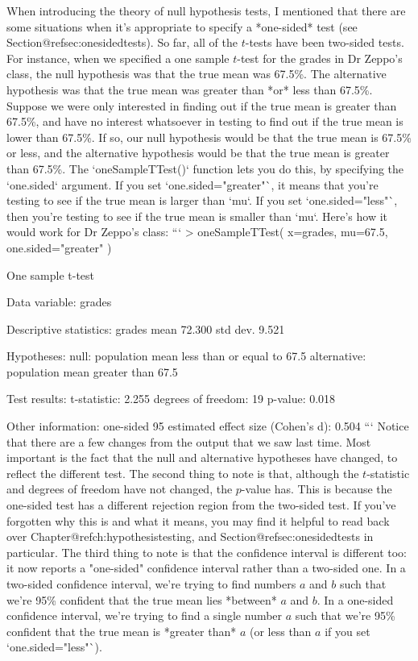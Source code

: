When introducing the theory of null hypothesis tests, I mentioned that there are some situations when it's appropriate to specify a *one-sided* test (see Section@refsec:onesidedtests). So far, all of the $t$-tests have been two-sided tests. For instance, when we specified a one sample $t$-test for the grades in Dr Zeppo's class, the null hypothesis was that the true mean was 67.5\%. The alternative hypothesis was that the true mean was greater than *or* less than 67.5\%. Suppose we were only interested in finding out if the true mean is greater than 67.5\%, and have no interest whatsoever in testing to find out if the true mean is lower than 67.5\%. If so, our null hypothesis would be that the true mean is 67.5\% or less, and the alternative hypothesis would be that the true mean is greater than 67.5\%. The `oneSampleTTest()` function lets you do this, by specifying the `one.sided` argument. If you set `one.sided="greater"`, it means that you're testing to see if the true mean is larger than `mu`. If you set `one.sided="less"`, then you're testing to see if the true mean is smaller than `mu`. Here's how it would work for Dr Zeppo's class:
```
> oneSampleTTest( x=grades, mu=67.5, one.sided="greater" )

   One sample t-test 

Data variable:   grades 

Descriptive statistics: 
            grades
   mean     72.300
   std dev.  9.521

Hypotheses: 
   null:        population mean less than or equal to 67.5 
   alternative: population mean greater than 67.5 

Test results: 
   t-statistic:  2.255 
   degrees of freedom:  19 
   p-value:  0.018 

Other information: 
   one-sided 95%
   estimated effect size (Cohen's d):  0.504 
```
Notice that there are a few changes from the output that we saw last time. Most important is the fact that the null and alternative hypotheses have changed, to reflect the different test. The second thing to note is that, although the $t$-statistic and degrees of freedom have not changed, the $p$-value has. This is because the one-sided test has a different rejection region from the two-sided test. If you've forgotten why this is and what it means, you may find it helpful to read back over Chapter@refch:hypothesistesting, and Section@refsec:onesidedtests in particular. The third thing to note is that the confidence interval is different too: it now reports a "one-sided" confidence interval rather than a two-sided one. In a two-sided confidence interval, we're trying to find numbers $a$ and $b$ such that we're 95\% confident that the true mean lies *between* $a$ and $b$. In a one-sided confidence interval, we're trying to find a single number $a$ such that we're 95\% confident that the true mean is *greater than* $a$ (or less than $a$ if you set `one.sided="less"`).

